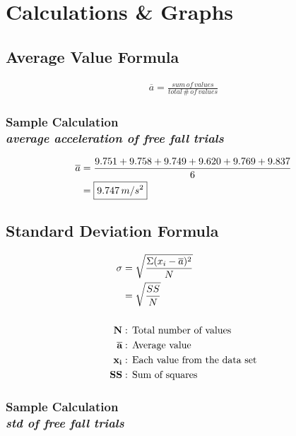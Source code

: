 
\section{Calculations \& Graphs}

\vspace{-0.5cm}
\singlespacing


\subsection{Average Value Formula} 

\begin{align*}
		\overline{a} = \frac{sum\,of\,values}{total\, \#\,of\,values} 
\end{align*}

\subsubsection{Sample Calculation \\ {\normalfont \small\textit{average acceleration of free fall trials}}}

\begin{align*}
	\overline{a} & = \frac{9.751 + 9.758 + 9.749 + 9.620 + 9.769 + 9.837}{6} \\
							 &= \boxed{9.747\thinspace m/s^2}
\end{align*}


\subsection{Standard Deviation Formula}

\begin{align*}
		\sigma &= \sqrt{\frac{\Sigma(x_i -\overline{a})^2}{N}} \\
		 &= \sqrt{\frac{SS}{N}} \\ \\
		\textbf{N} &:\, \text{Total number of values} \\
		\overline{\textbf{a}} &:\, \text{Average value} \\
		\textbf{x\textsubscript{i}} &:\, \text{Each value from the data set} \\
		\textbf{SS} &:\, \text{Sum of squares} 
\end{align*}

\subsubsection{Sample Calculation \\ {\normalfont \small\textit{std of free fall trials}}}

